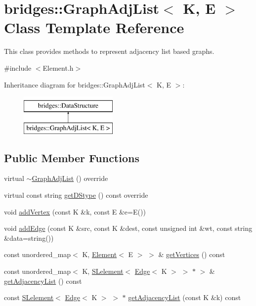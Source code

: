 \hypertarget{classbridges_1_1_graph_adj_list}{}\section{bridges\+:\+:Graph\+Adj\+List$<$ K, E $>$ Class Template Reference}
\label{classbridges_1_1_graph_adj_list}


This class provides methods to represent adjacency list based graphs.  




{\ttfamily \#include $<$Element.\+h$>$}

Inheritance diagram for bridges\+:\+:Graph\+Adj\+List$<$ K, E $>$\+:\begin{figure}[H]
\begin{center}
\leavevmode
\includegraphics[height=2.000000cm]{classbridges_1_1_graph_adj_list}
\end{center}
\end{figure}
\subsection*{Public Member Functions}
\begin{DoxyCompactItemize}
\item 
virtual \hyperlink{classbridges_1_1_graph_adj_list_a72a783f3136b10b5abef0c32364e9ea1}{$\sim$\+Graph\+Adj\+List} () override
\item 
virtual const string \hyperlink{classbridges_1_1_graph_adj_list_a598803ce2292ce3fa23fbd3f37f12176}{get\+D\+Stype} () const  override
\item 
void \hyperlink{classbridges_1_1_graph_adj_list_a8e97b282f1fc28f1ecda90bf3fc38d76}{add\+Vertex} (const K \&k, const E \&e=E())
\item 
void \hyperlink{classbridges_1_1_graph_adj_list_a0e53ad3b952a149e48e785c55ea2d6f6}{add\+Edge} (const K \&src, const K \&dest, const unsigned int \&wt, const string \&data=string())
\item 
const unordered\+\_\+map$<$ K, \hyperlink{classbridges_1_1_element}{Element}$<$ E $>$ $>$ \& \hyperlink{classbridges_1_1_graph_adj_list_aee986c1bcb793ce3caea4e978560def2}{get\+Vertices} () const 
\item 
const unordered\+\_\+map$<$ K, \hyperlink{classbridges_1_1_s_lelement}{S\+Lelement}$<$ \hyperlink{classbridges_1_1_edge}{Edge}$<$ K $>$ $>$ $\ast$ $>$ \& \hyperlink{classbridges_1_1_graph_adj_list_aa6b4508c108c14b2c254356370b3f8e5}{get\+Adjacency\+List} () const 
\item 
const \hyperlink{classbridges_1_1_s_lelement}{S\+Lelement}$<$ \hyperlink{classbridges_1_1_edge}{Edge}$<$ K $>$ $>$ $\ast$ \hyperlink{classbridges_1_1_graph_adj_list_a59c23d9bd8327b84abe4c5cb85aea986}{get\+Adjacency\+List} (const K \&k) const 
\end{DoxyCompactItemize}
